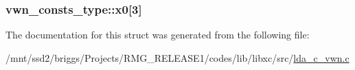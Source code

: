 \hypertarget{structvwn__consts__type_ad40695b3de79919651cd59e9878120c9}{
\subsubsection[{x0}]{ vwn\-\_\-consts\-\_\-type\-::x0\mbox{[}3\mbox{]}}}\label{structvwn__consts__type_ad40695b3de79919651cd59e9878120c9}


The documentation for this struct was generated from the following file\-:\begin{DoxyCompactItemize}
\item 
/mnt/ssd2/briggs/\-Projects/\-R\-M\-G\-\_\-\-R\-E\-L\-E\-A\-S\-E1/codes/lib/libxc/src/\hyperlink{lda__c__vwn_8c}{lda\-\_\-c\-\_\-vwn.\-c}\end{DoxyCompactItemize}
